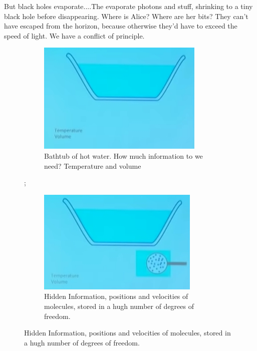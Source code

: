 \documentclass[]{article}
\begin{document}
{\begin{appendices}
	But black holes evaporate....The evaporate photons and stuff, shrinking to a tiny black hole before disappearing. Where is Alice? Where are her bits? They can't have escaped from the horizon, because otherwise they'd have to exceed the speed of light. We have a conflict of principle.
	
	\begin{figure}[H]
		\caption{Entropy--Information that is hidden.}
		\begin{subfigure}[t]{0.45\textwidth}
			\caption{Bathtub of hot water. How much information to we need? Temperature and volume}
			\includegraphics[width=\textwidth]{wh-bathtub}
		\end{subfigure}
		;\
		\begin{subfigure}[t]{0.45\textwidth}
			\caption{Hidden Information, positions and velocities of molecules, stored in a hugh number of degrees of freedom.}
			\includegraphics[width=\textwidth]{wh-bathtub-detail}
		\end{subfigure}
	\end{figure}
	

\end{appendices}}
\end{document}
